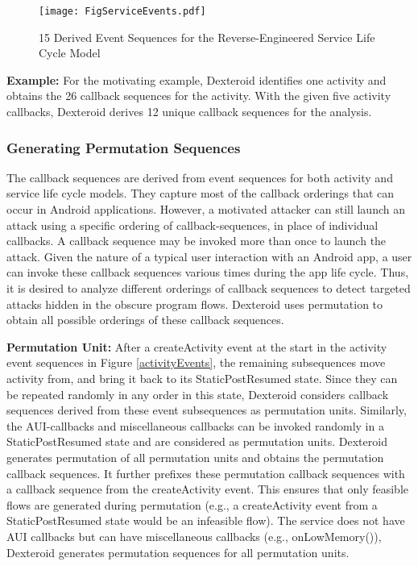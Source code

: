 \documentclass[10pt]{elsarticle}
\begin{document}
\begin{figure}[ht]
\centering
\texttt{[image: FigServiceEvents.pdf]}
\caption{15 Derived Event Sequences for the Reverse-Engineered Service Life Cycle Model}
\label{serviceEvents}
\end{figure}

{\noindent \bf Example:} \label {scenariosExample} For the motivating example, Dexteroid identifies one activity and obtains the 26 callback sequences for the activity. With the given five activity callbacks, Dexteroid derives 12 unique callback sequences for the analysis.

\newcommand*{\permcomb}[4][0mu]{{{}^{#3}\mkern#1#2_{#4}}}
\newcommand*{\perm}[1][-3mu]{\permcomb[#1]{P}}

\subsubsection {Generating Permutation Sequences} 

The callback sequences are derived from event sequences for both activity and service life cycle models. They capture most of the callback orderings that can occur in Android applications. However, a  motivated attacker can still launch an attack using a specific ordering of callback-sequences, in place of individual callbacks. A callback sequence may be invoked more than once to launch the attack. Given the nature of a typical user interaction with an Android app, a user can invoke these callback sequences various times during the app life cycle. Thus, it is desired to analyze different orderings of callback sequences to detect targeted attacks hidden in the obscure program flows. Dexteroid uses permutation to obtain all possible orderings of these callback sequences. 

{\noindent \bf Permutation Unit:} After a createActivity event at the start in the activity event sequences in Figure \ref{activityEvents}, the remaining subsequences move activity from, and bring it back to its StaticPostResumed state. Since they can be repeated randomly in any order in this state, Dexteroid considers callback sequences derived from these event subsequences as permutation units. Similarly, the AUI-callbacks and miscellaneous callbacks can be invoked randomly in a StaticPostResumed state and are considered as permutation units. Dexteroid generates permutation of all permutation units and obtains the permutation callback sequences. It further prefixes these permutation callback sequences with a callback sequence from the createActivity event. This ensures that only feasible flows are generated during permutation (e.g., a createActivity event from a StaticPostResumed state would be an infeasible flow). The service does not have AUI callbacks but can have miscellaneous callbacks (e.g., {\ttfamily onLowMemory()}), Dexteroid generates permutation sequences for all permutation units.
\end{document}
